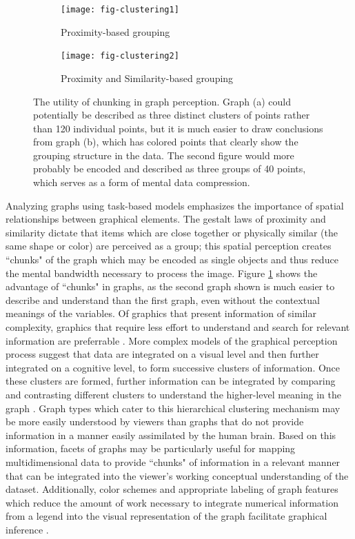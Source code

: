 \documentclass[11pt]{isuthesis}\usepackage[]{graphicx}\usepackage[]{color}
\begin{document}
\begin{figure}[htbp]\centering
\begin{subfigure}[b]{.45\linewidth}\centering
  \texttt{[image: fig-clustering1]}
  \caption{Proximity-based grouping}
\end{subfigure}\hfill
\begin{subfigure}[b]{.45\linewidth}\centering
  \texttt{[image: fig-clustering2]}
  \caption{Proximity and Similarity-based grouping}
\end{subfigure}\hfill
\caption[Chunking in Graphs]{The utility of chunking in graph perception. Graph (a) could potentially be described as three distinct clusters of points rather than 120 individual points, but it is much easier to draw conclusions from graph (b), which has colored points that clearly show the grouping structure in the data. The second figure would more probably be encoded and described as three groups of 40 points, which serves as a form of mental data compression.}\label{fig:clustering}
\end{figure}

Analyzing graphs using task-based models emphasizes the importance of spatial relationships between graphical elements. The gestalt laws of proximity and similarity dictate that items which are close together or physically similar (the same shape or color) are perceived as a group; this spatial perception creates ``chunks" of the graph which may be encoded as single objects and thus reduce the mental bandwidth necessary to process the image. Figure \ref{fig:clustering} shows the advantage of ``chunks" in graphs, as the second graph shown is much easier to describe and understand than the first graph, even without the contextual meanings of the variables. Of graphics that present information of similar complexity, graphics that require less effort to understand and search for relevant information are preferrable \citep{cleveland:1985}. More complex models of the graphical perception process suggest that data are integrated on a visual level and then further integrated on a cognitive level, to form successive clusters of information. Once these clusters are formed, further information can be integrated by comparing and contrasting different clusters to understand the higher-level meaning in the graph \citep{ratwani2008thinking}. Graph types which cater to this hierarchical clustering mechanism may be more easily understood by viewers than graphs that do not provide information in a manner easily assimilated by the human brain. Based on this information, facets of graphs may be particularly useful for mapping multidimensional data to provide ``chunks" of information in a relevant manner that can be integrated into the viewer's working conceptual understanding of the dataset. Additionally, color schemes and appropriate labeling of graph features which reduce the amount of work necessary to integrate numerical information from a legend into the visual representation of the graph facilitate graphical inference \citep{carpenter1998model}.
\end{document}
